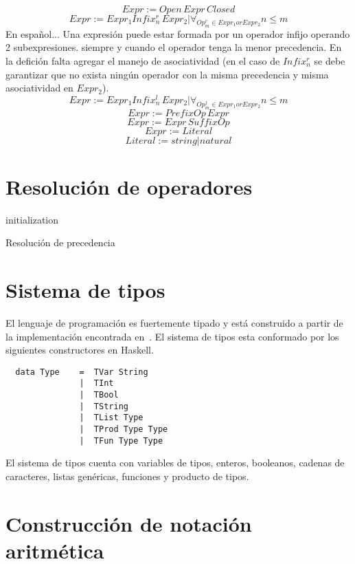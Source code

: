 $$Expr := Open \, Expr \, Closed $$
$$Expr :=  Expr_{1} Infix_{n}^{r} \, Expr_{2} | \forall_{Op_{m}^{r} \in Expr_{1} or Expr_{2}} n \leq m $$
En español... Una expresión puede estar formada por un operador infijo operando 2
subexpresiones. siempre y cuando el operador tenga la menor precedencia. En la defición falta
agregar el manejo de asociatividad (en el caso de $Infix_{n}^{r}$ se debe garantizar que no exista ningún
operador con la misma precedencia y misma asociatividad en $Expr_{2}$).
$$Expr :=  Expr_{1} Infix_{n}^{l} \, Expr_{2} | \forall_{Op_{m}^{j} \in Expr_{1} or Expr_{2}} n \leq m $$
$$Expr :=  PrefixOp \, Expr $$
$$Expr :=  Expr \, SuffixOp $$
$$Expr :=  Literal $$
$$Literal := string|natural$$

\section{Resolución de operadores}

\begin{algorithm}[H]
  \SetLine
  initialization\;
  \caption{Resolución de precedencia}
\end{algorithm}

\section{Sistema de tipos}
El lenguaje de programación es fuertemente tipado y está construido a partir de 
la implementación encontrada en~\cite{WStepByStep:Martin}. El sistema de tipos esta
conformado por los siguientes constructores en Haskell.
\begin{verbatim}
  data Type    =  TVar String
               |  TInt   
               |  TBool
               |  TString
               |  TList Type
               |  TProd Type Type
               |  TFun Type Type
\end{verbatim}

El sistema de tipos cuenta con variables de tipos, enteros, booleanos, cadenas de
caracteres, listas genéricas, funciones y producto de tipos. 

\section{Construcción de notación aritmética}
\section{}


